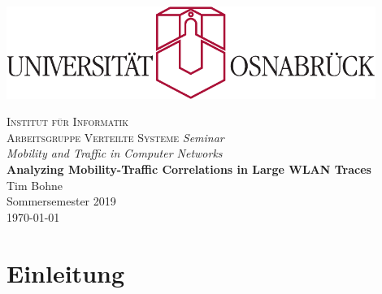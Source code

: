 \documentclass[12pt, a4paper]{article}
\begin{document}

\begin{titlepage}
\centering
\thispagestyle{empty}
\begin{center}
\includegraphics[width=0.9\textwidth]{uos.pdf}
\end{center}
\LARGE{\textsc{Institut für Informatik\\Arbeitsgruppe Verteilte Systeme}}
\vfill
\LARGE{\emph{Seminar}}\\
\LARGE{\emph{Mobility and Traffic in Computer Networks}}\\
\vspace{8mm}
\huge{\textbf{{\selectfont
Analyzing Mobility-Traffic Correlations in Large WLAN Traces}}}\\
\vspace{9mm}
\LARGE{Tim Bohne}\\
\vspace{0.2cm}
\vspace{4cm}
\large{Sommersemester 2019}\\
\vspace{0.2cm}
\large{\today}
\vfill
\end{titlepage}
\newpage

\tableofcontents
\newpage

\pagestyle{plain}

\section{Einleitung}
\end{document}
